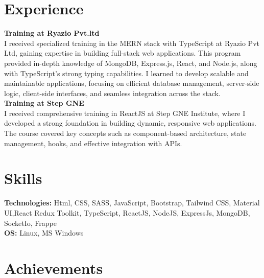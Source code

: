 \documentclass[letterpaper, 8pt]{article}
\newcommand{\secStartSpace}{\vspace{3pt}}
\newcommand{\secEndSpace}{\vspace{4pt}}
\begin{document}
\section{\color{blue} \textbf{Experience}}
\secStartSpace


\begin{addmargin}[1em]{1em}
\noindent \textbf{Training at Ryazio Pvt.ltd} 
\\
I received specialized training in the MERN stack with TypeScript at Ryazio Pvt Ltd, gaining expertise in building full-stack web applications. This program provided in-depth knowledge of MongoDB, Express.js, React, and Node.js, along with TypeScript's strong typing capabilities. I learned to develop scalable and maintainable applications, focusing on efficient database management, server-side logic, client-side interfaces, and seamless integration across the stack.
\\
\noindent \textbf{Training at Step GNE} 
\\
I received comprehensive training in ReactJS at Step GNE Institute, where I developed a strong foundation in building dynamic, responsive web applications. The course covered key concepts such as component-based architecture, state management, hooks, and effective integration with APIs.
\end{addmargin}
\secEndSpace
\n
\section{\color{blue} \textbf{Skills}}
\secStartSpace

\begin{addmargin}[1em]{1em}
	\noindent \textbf{Technologies:} Html, CSS, SASS, JavaScript, Bootstrap, Tailwind CSS, Material UI,React Redux Toolkit, TypeScript, ReactJS, NodeJS, ExpressJs, MongoDB, SocketIo, Frappe \\
	\noindent \textbf{OS:} Linux, MS Windows\\
\end{addmargin}
\secEndSpace


\section{\color{blue} \textbf{Achievements}}
\secStartSpace
\end{document}
